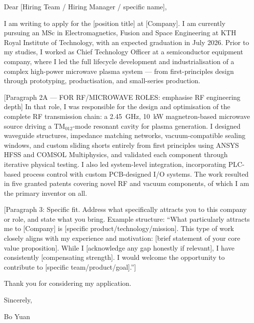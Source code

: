 \documentclass[a4paper,11pt]{article}
\begin{document}
\noindent
Dear [Hiring Team / Hiring Manager / specific name],

\vspace{0.4cm}

I am writing to apply for the [position title] at [Company].
I am currently pursuing an MSc in Electromagnetics, Fusion and Space Engineering
at KTH Royal Institute of Technology, with an expected graduation in July 2026.
Prior to my studies, I worked as Chief Technology Officer at a semiconductor
equipment company, where I led the full lifecycle development and industrialisation
of a complex high-power microwave plasma system --- from first-principles design
through prototyping, productisation, and small-series production.

\vspace{0.3cm}

[Paragraph 2A — FOR RF/MICROWAVE ROLES: emphasise RF engineering depth]
In that role, I was responsible for the design and optimisation of the complete
RF transmission chain: a 2.45~GHz, 10~kW magnetron-based microwave source driving
a TM$_{012}$-mode resonant cavity for plasma generation. I designed waveguide
structures, impedance matching networks, vacuum-compatible sealing windows, and
custom sliding shorts entirely from first principles using ANSYS HFSS and COMSOL
Multiphysics, and validated each component through iterative physical testing. I also
led system-level integration, incorporating PLC-based process control with custom
PCB-designed I/O systems. The work resulted in five granted patents covering novel
RF and vacuum components, of which I am the primary inventor on all.


\vspace{0.3cm}

[Paragraph 3: Specific fit. Address what specifically attracts you to this company
or role, and state what you bring. Example structure: ``What particularly attracts
me to [Company] is [specific product/technology/mission]. This type of work closely
aligns with my experience and motivation: [brief statement of your core value
proposition]. While I [acknowledge any gap honestly if relevant], I have consistently
[compensating strength]. I would welcome the opportunity to contribute to [specific
team/product/goal].'']

\vspace{0.3cm}

Thank you for considering my application.

\vspace{0.6cm}

\noindent
Sincerely, \\

\vspace{0.3cm}

\noindent
Bo Yuan
\end{document}
